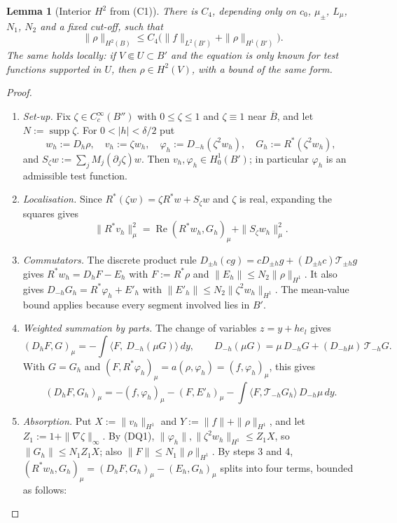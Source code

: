\documentclass[11pt]{article}
\theoremstyle{plain}
\newtheorem{lemma}[theorem]{Lemma}
\theoremstyle{definition}
\theoremstyle{remark}
\begin{document}
\begin{lemma}[Interior $H^2$ from (C1)]\label{lem:h2}
There is $C_4$, depending only on $c_0$, $\mu_\pm$, $L_\mu$, $N_1$, $N_2$ and a fixed cut-off, such that
\[
  \|\rho\|_{H^2(B)} \le C_4\bigl(\|f\|_{L^2(B')} + \|\rho\|_{H^1(B')}\bigr).
\]
The same holds locally: if $V \Subset U \subset B'$ and the equation is only known for test functions supported in $U$, then $\rho \in H^2(V)$, with a bound of the same form.
\end{lemma}

\begin{proof}
\begin{enumerate}
  \item \emph{Set-up.} Fix $\zeta \in C^\infty_c(B'')$ with $0 \le \zeta \le 1$ and $\zeta \equiv 1$ near $\overline B$, and let $N := \operatorname{supp}\zeta$. For $0 < |h| < \delta/2$ put
  \[
    w_h := D_h\rho,\quad v_h := \zeta w_h,\quad \varphi_h := D_{-h}(\zeta^2w_h),\quad G_h := R^*(\zeta^2w_h),
  \]
  and $S_\zeta w := \sum_jM_j(\partial_j\zeta)w$.
  Then $v_h, \varphi_h \in H^1_0(B')$; in particular $\varphi_h$ is an admissible test function.
  \item \emph{Localisation.} Since $R^*(\zeta w) = \zeta R^*w + S_\zeta w$ and $\zeta$ is real, expanding the squares gives
  \[
    \|R^*v_h\|_\mu^2 = \operatorname{Re}(R^*w_h,G_h)_\mu + \|S_\zeta w_h\|_\mu^2 .
  \]
  \item \emph{Commutators.} The discrete product rule $D_{\pm h}(cg) = cD_{\pm h}g + (D_{\pm h}c)\mathcal T_{\pm h}g$ gives $R^*w_h = D_hF - E_h$ with $F := R^*\rho$ and $\|E_h\| \le N_2\|\rho\|_{H^1}$. It also gives $D_{-h}G_h = R^*\varphi_h + E'_h$ with $\|E'_h\| \le N_2\|\zeta^2w_h\|_{H^1}$. The mean-value bound applies because every segment involved lies in $B'$.
  \item \emph{Weighted summation by parts.} The change of variables $z = y + he_l$ gives
  \[
    (D_hF,G)_\mu = -\int\langle F,\ D_{-h}(\mu G)\rangle\,dy,
    \qquad
    D_{-h}(\mu G) = \mu\,D_{-h}G + (D_{-h}\mu)\,\mathcal T_{-h}G .
  \]
  With $G = G_h$ and $(F,R^*\varphi_h)_\mu = a(\rho,\varphi_h) = (f,\varphi_h)_\mu$, this gives
  \[
    (D_hF,G_h)_\mu = -(f,\varphi_h)_\mu - (F,E'_h)_\mu - \int\langle F,\mathcal T_{-h}G_h\rangle\,D_{-h}\mu\,dy .
  \]
  \item \emph{Absorption.} Put $X := \|v_h\|_{H^1}$ and $Y := \|f\| + \|\rho\|_{H^1}$, and let $Z_1 := 1 + \|\nabla\zeta\|_\infty$. By (DQ1), $\|\varphi_h\|, \|\zeta^2w_h\|_{H^1} \le Z_1X$, so $\|G_h\| \le N_1Z_1X$; also $\|F\| \le N_1\|\rho\|_{H^1}$. By steps 3 and 4, $(R^*w_h,G_h)_\mu = (D_hF,G_h)_\mu - (E_h,G_h)_\mu$ splits into four terms, bounded as follows:

\end{enumerate}
\end{proof}
\end{document}
